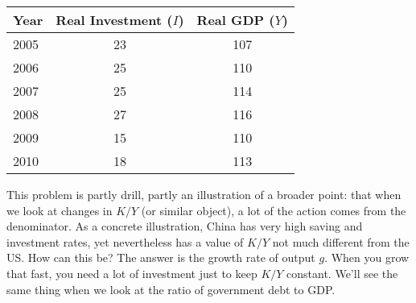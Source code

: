 \documentclass[12pt]{exam}
\begin{document}
\begin{questions}
\begin{center}
\begin{tabular}{lcc}
\toprule
Year \phantom{xxxxx}   & Real Investment ($I$)  &  Real GDP ($Y$) \\
\midrule
2005    &  23  &  107 \\
2006    &  25  &  110 \\
2007    &  25  &  114 \\
2008    &  27  &  116 \\
2009    &  15  &  110 \\
2010    &  18  &  113 \\
\bottomrule
\end{tabular}
\end{center}
%



\begin{solution}
This problem is partly drill, partly an illustration of a broader
point:  that when we look at changes in $K/Y$ (or similar object),
a lot of the action comes from the denominator.
As a concrete illustration, China has very high saving and investment rates,
yet nevertheless has a value of $K/Y$ not much different from the US.
How can this be?  The answer is the growth rate of output $g$.
When you grow that fast, you need a lot of investment just to keep
$K/Y$ constant.
We'll see the same thing when we look at the ratio of
government debt to GDP.


\end{solution}
\end{questions}
\end{document}
